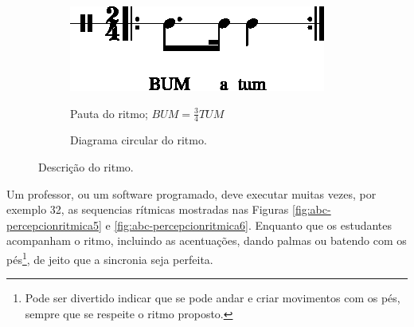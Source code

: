 \begin{figure}[H]
\centering
     \begin{subfigure}[c]{0.45\textwidth}
         \centering
         \href{https://drive.google.com/file/d/1ZR0CPhwBYIp2TrqM8cAq_oyI3o-NZPbw/view?usp=sharing}{\includegraphics[width=\textwidth]{chapters/cap-musicalidade-percepcion/treino-ritmo4-1.eps}}
         \caption{Pauta do ritmo; $BUM=\frac{3}{4}TUM$}
         \label{fig:RitmoTUMatum1}
     \end{subfigure}
     \hfill
     \begin{subfigure}[c]{0.45\textwidth}
         \centering
{}
         \caption{Diagrama circular do ritmo.}
         \label{fig:RitmoTUMatum2}
     \end{subfigure}
\caption{Descrição do ritmo.}
\label{fig:abc-percepcionritmica4}
\end{figure}

\begin{example}
Um professor, ou um software programado, 
deve executar muitas vezes, por exemplo 32, 
as sequencias rítmicas mostradas nas Figuras 
\ref{fig:abc-percepcionritmica5} e \ref{fig:abc-percepcionritmica6}.
Enquanto que os estudantes acompanham o ritmo, 
incluindo as acentuações, dando palmas ou batendo com os pés\footnote{Pode
ser divertido indicar que se pode andar e criar movimentos com os pés, 
sempre que se respeite o ritmo proposto.},
de jeito que a sincronia seja perfeita.
\end{example}

